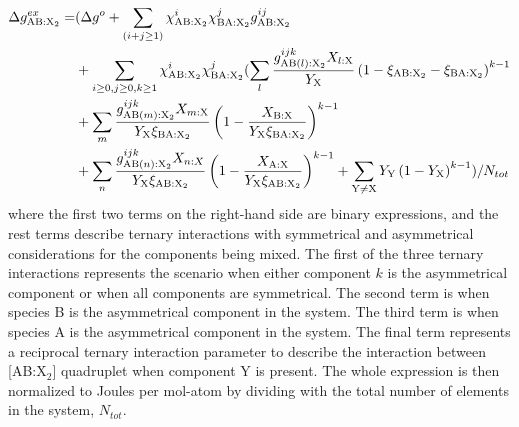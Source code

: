 \begin{equation}
    \begin{aligned}
        {\Delta}g_{\rm AB:X_2}^{ex}=&(\Delta g^o+\sum_{\left(i+j\geq1\right)}{\chi_{\rm AB:X_2}^i\chi_{\rm BA:X_2}^jg_{\rm AB:X_2}^{ij}}\\&+\sum_{i\geq 0, j\geq 0, k\geq 1}\chi_{\rm AB:X_2}^i\chi_{\rm BA:X_2}^j(\sum_{l}{\frac{g_{{\rm AB}\left(l\right){:\rm X}_2}^{ijk}X_{l:{\rm X}}}{Y_{\rm X}}\left(1-\xi_{\rm AB:X_2}-\xi_{\rm BA:X_2}\right)^{k-1}}\\&+\sum_m\frac{g_{{\rm AB}\left(m\right):{\rm X}_2}^{ijk}X_{m:{\rm X}}}{Y_{\rm X}\xi_{\rm BA:X_2}}\left(1-\frac{X_{\rm B:X}}{Y_{\rm X}\xi_{\rm BA:X_2}}\right)^{k-1}\\&+\sum_{n}{\frac{g_{{\rm AB}\left(n\right):{\rm X}_2}^{ijk}X_{n:X}}{Y_{\rm X}\xi_{\rm AB:X_2}}\left(1-\frac{X_{\rm A:X}}{Y_{\rm X}\xi_{\rm AB:X_2}}\right)^{k-1}+\sum_{\rm Y\neq X}{Y_{\rm Y}\left(1-Y_{\rm X}\right)^{k-1}}})/N_{tot}
    \end{aligned}
\end{equation}
where the first two terms on the right-hand side are binary expressions, and the rest terms describe ternary interactions with symmetrical and asymmetrical considerations for the components being mixed. The first of the three ternary interactions represents the scenario when either component $k$ is the asymmetrical component or when all components are symmetrical. The second term is when species B is the asymmetrical component in the system. The third term is when species A is the asymmetrical component in the system. The final term represents a reciprocal ternary interaction parameter to describe the interaction between [AB:X$_2$] quadruplet when component Y is present. The whole expression is then normalized to Joules per mol-atom by dividing with the total number of elements in the system, $N_{tot}$. 

